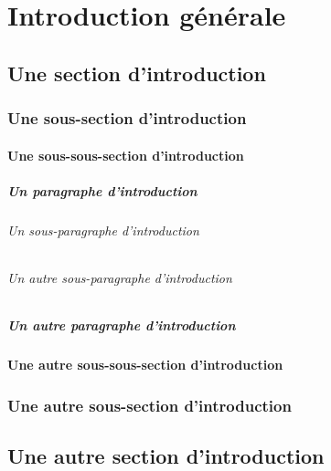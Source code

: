 \chapter*{Introduction générale}
\lipsum[26-27]
\section{Une section d'introduction}
\lipsum[28-29]
\subsection{Une sous-section d'introduction}
\lipsum[29-31]
\subsubsection{Une sous-sous-section d'introduction}
\lipsum[31-35]
\paragraph{Un paragraphe d'introduction}
\lipsum[36-38]
\subparagraph{Un sous-paragraphe d'introduction}
\lipsum[39-41]
\subparagraph{Un autre sous-paragraphe d'introduction}
\lipsum[39-41]
\paragraph{Un autre paragraphe d'introduction}
\lipsum[36-38]
\subsubsection{Une autre sous-sous-section d'introduction}
\lipsum[31-37]
\subsection{Une autre sous-section d'introduction}
\lipsum[29-31]
\section{Une autre section d'introduction}
\lipsum[28-43]
